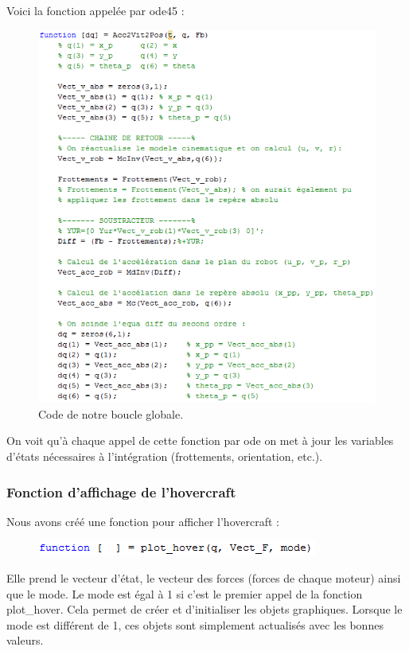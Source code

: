 \documentclass[a4paper,10pt]{article}
\begin{document}
Voici la fonction appelée par ode45 :
\begin{figure}[H]
\bigcenter\includegraphics[scale=0.8]{images/Schema_global.png}
\caption{Code de notre boucle globale.}
\end{figure}

On voit qu’à chaque appel de cette fonction par ode on met à jour les variables d’états nécessaires à l’intégration (frottements, orientation, etc.).

\subsubsection{Fonction d'affichage de l'hovercraft}
Nous avons créé une fonction pour afficher l'hovercraft :
\begin{figure}[H]
\bigcenter\includegraphics[scale=0.8]{images/plothoverfunction.png}
\end{figure}

Elle prend le vecteur d’état, le vecteur des forces (forces de chaque moteur) ainsi que le mode. Le mode est égal à 1 si c’est le premier appel de la fonction plot\_hover. Cela permet de créer et d’initialiser les objets graphiques. Lorsque le mode est différent de 1, ces objets sont simplement actualisés avec les bonnes valeurs. 
\end{document}
